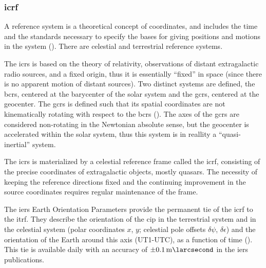 \subsubsection{\gls{icrf}}\label{sssec:icrf}

A reference system is a theoretical concept of coordinates, and includes the time
and the standards necessary to specify the bases for giving positions and motions
in the system (\cite{Gurfil18}). There are celestial and terrestrial reference systems.

The \gls{icrs} is based on the theory of relativity, observations of distant 
extragalactic radio sources, and a fixed origin, thus it is essentially ``fixed'' 
in space (since there is no apparent motion of distant sources). 
Two distinct systems are defined, the \gls{bcrs}, centered at the barycenter of the solar system and 
the \gls{gcrs}, centered at the geocenter. The \gls{gcrs} is defined such that its spatial 
coordinates are not kinematically rotating with respect to the \gls{bcrs} (\cite{Gurfil18}).
The axes of the \gls{gcrs} are considered non-rotating in the Newtonian absolute sense, 
but the geocenter is accelerated within the solar system, thus this system is in 
reallity a ``quasi-inertial'' system.

The \gls{icrs} is materialized by a celestial reference frame called the \gls{icrf}, 
consisting of the precise coordinates of extragalactic objects, mostly quasars. The 
necessity of keeping the reference directions fixed and the continuing improvement 
in the source coordinates requires regular maintenance of the frame.

The \gls{iers} Earth Orientation Parameters provide the permanent tie of the \gls{icrf}
to the \gls{itrf}. They describe the orientation of the \gls{cip}
in the terrestrial system and in the celestial system (polar coordinates $x$,
$y$; celestial pole offsets $\delta \psi$, $\delta \epsilon$) and the orientation 
of the Earth around this axis (UT1-UTC), as a function of time (\cite{iers2010}). 
This tie is available daily with an accuracy of $\pm\SI{0.1}{\milli\larcsecond}$ in the 
\gls{iers} publications.
